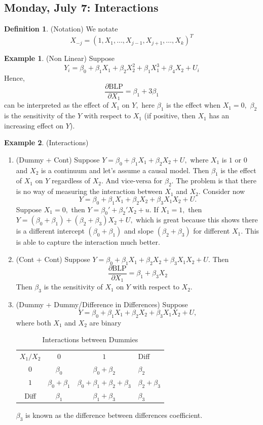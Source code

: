 \documentclass[10pt, oneside]{article}
\theoremstyle{definition}
\newtheorem{exmp}{Example}[section]
\newtheorem{defn}{Definition}
\begin{document}
\subsection{Monday, July 7: Interactions}
\begin{defn}
    (Notation) We notate
    \[X_{-j} = (1, X_1, \dots, X_{j-1}, X_{j+1}, \dots, X_k)^T\]
\end{defn}
\begin{exmp}
    (Non Linear) 
    Suppose 
    \[Y_i = \beta_0 + \beta_1 X_1 + \beta_2 X_2^2 + \beta_1X_1^3 + \beta_4 X_2 + U_i\]
    Hence, 
    \[\frac{\partial \text{BLP}}{\partial X_1} = \beta_1 + 3\beta_1 \] can be interpreted as the effect of $X_1$ on $Y,$ here $\beta_1$ is the effect when $X _1= 0,$ $\beta_2$ is the sensitivity of the $Y$ with respect to $X_1$ (if positive, then $X_1$ has an increasing effect on $Y$).  
\end{exmp}
\begin{exmp}
    (Interactions) 
    \begin{enumerate}
        \item (Dummy + Cont) Suppose $Y = \beta_0 + \beta_1 X_1 + \beta_2 X_2 + U,$ where $X_1$ is $1$ or $0$ and $X_2$ is a continuum and let's assume a causal model. Then $\beta_1$ is the effect of $X_1$ on $Y$ regardless of $X_2.$ And vice-versa for $\beta_2.$ The problem is that there is no way of measuring the interaction between $X_1$ and $X_2.$ Consider now 
        \[Y = \beta_0 + \beta_1X_1 + \beta_2 X_2 + \beta_3 X_1X_2 + U.\] Suppose $X_1 = 0,$ then $Y = \beta_0' + \beta_2' X_2 + u.$ If $X_1 = 1,$ then $Y = (\beta_0 + \beta_1) + (\beta_2 + \beta_3)X_2 + U,$ which is great because this shows there is a different intercept $(\beta_0 + \beta_1)$ and slope $(\beta_2 + \beta_3)$ for different $X_1.$ This is able to capture the interaction much better. 
        \item (Cont + Cont) Suppose $Y = \beta_0 + \beta_1X_1 + \beta_2 X_2 + \beta_3 X_1X_2 + U.$ Then 
        \[\frac{\partial\text{BLP}}{\partial X_1} = \beta_1 + \beta_3 X_2\] Then $\beta_3$ is the sensitivity of $X_1$ on $Y$ with respect to $X_2.$
        \item (Dummy + Dummy/Difference in Differences) Suppose 
        \[Y = \beta_0 + \beta_1 X_1 + \beta_2 X_2 + \beta_3 X_1 X_2 + U,\] where both $X_1$ and $X_2$ are binary

\begin{table}[H]
    \centering
    \begin{tabular}{cccl}
       $X_1/X_2$&$0$& $1$ &Diff\\
         $0$&  $\beta_0$&  $\beta_0  + \beta_2$&$\beta_2$\\
         $1$&  $\beta_0 + \beta_1$&  $\beta_0 + \beta_1+ \beta_2 + \beta_3$&$\beta_2 + \beta_3$\\
 Diff& $\beta_1$& $\beta_1 + \beta_3 $&$\beta_3$\\
    \end{tabular}
    \caption{Interactions between Dummies}
    \label{tab:my_label}
\end{table}

$\beta_3$ is known as the difference between differences coefficient.
    \end{enumerate}
\end{exmp}
\end{document}

